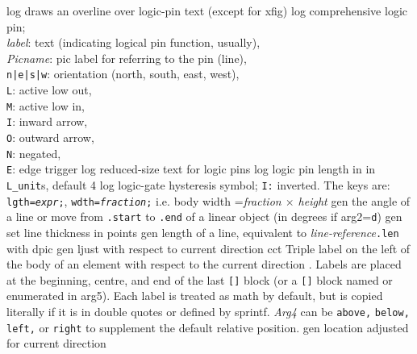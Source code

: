   {log}%
  {draws an overline over logic-pin text (except for xfig)}%
%
  {log}%
  {comprehensive logic pin;\\
   {\sl label}: text (indicating logical pin function, usually),\\
   {\sl Picname}: pic label for referring to the pin (line),\\
   {\tt n|e|s|w}: orientation (north, south, east, west),\\
   {\tt L}: active low out,\\
   {\tt M}: active low in,\\
   {\tt I}: inward arrow,\\
   {\tt O}: outward arrow,\\
   {\tt N}: negated,\\
   {\tt E}: edge trigger}%
%
  {log}%
  {reduced-size text for logic pins}%
%
  {log}%
  {logic pin length in in {\tt L\_unit}s, default 4}%
%
  {log}%
  {logic-gate hysteresis symbol; {\tt I:} inverted. The keys are:
    {\tt lgth={\sl expr};}, 
    {\tt wdth={\sl fraction};} i.e. body width ={\sl fraction $\times$ height}}%
%
  {gen}%
  {the angle of a line or move from {\tt .start} to {\tt .end} of a linear
   object (in degrees if arg2={\tt d})}%
%
  {gen}%
  {set line thickness in points}%
%
  {gen}%
  {length of a line, equivalent to {\sl line-reference}{\tt .len}
   with dpic}%
%
  {gen}%
  {ljust with respect to current direction}%
%
  {cct}%
  {Triple label on the left of the body of an element with respect to the
    current direction .  Labels are placed at the
    beginning, centre, and end of the last {\tt []} block (or a {\tt []} block
    named or enumerated in arg5). Each label is treated as math by
    default, but is copied literally if it is in double quotes or defined
    by sprintf.  {\sl Arg4} can be {\tt above,} {\tt below,} {\tt left,}
    or {\tt right} to supplement the default relative position.}%
%
  {gen}%
  {location adjusted for current direction}%
